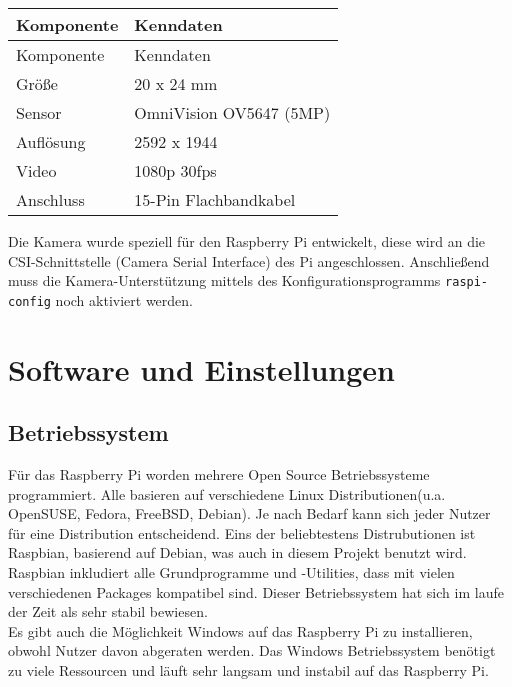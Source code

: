 \begin{longtable}{||l|l||}

\hline
Komponente & Kenndaten\\ \hline\hline
\endfirsthead
\hline
Komponente & Kenndaten \\ \hline\hline
\endhead

Größe & 20 x 24 mm\\ \hline
Sensor & OmniVision OV5647 (5MP)\\ \hline
Auflösung & 2592 x 1944\\ \hline
Video & 1080p \@ 30fps \\ \hline
Anschluss & 15-Pin Flachbandkabel\\ \hline

\end{longtable}

Die Kamera wurde speziell für den Raspberry Pi entwickelt, diese wird an die CSI-Schnittstelle (Camera Serial Interface) des Pi angeschlossen. Anschließend muss die Kamera-Unterstützung mittels des Konfigurationsprogramms \texttt{raspi-config} noch aktiviert werden.

\newpage

\section{Software und Einstellungen}

\subsection{Betriebssystem}
Für das Raspberry Pi worden mehrere Open Source Betriebssysteme programmiert. Alle basieren auf verschiedene Linux Distributionen(u.a. OpenSUSE, Fedora, FreeBSD, Debian). Je nach Bedarf kann sich jeder Nutzer für eine Distribution entscheidend. Eins der beliebtestens Distrubutionen ist Raspbian, basierend auf Debian, was auch in diesem Projekt benutzt wird. Raspbian inkludiert alle Grundprogramme und -Utilities, dass mit vielen verschiedenen Packages kompatibel sind. Dieser Betriebssystem hat sich im laufe der Zeit als sehr stabil bewiesen.\\

Es gibt auch die Möglichkeit Windows auf das Raspberry Pi zu installieren, obwohl Nutzer davon abgeraten werden. Das Windows Betriebssystem benötigt zu viele Ressourcen und läuft sehr langsam und instabil auf das Raspberry Pi.\\

